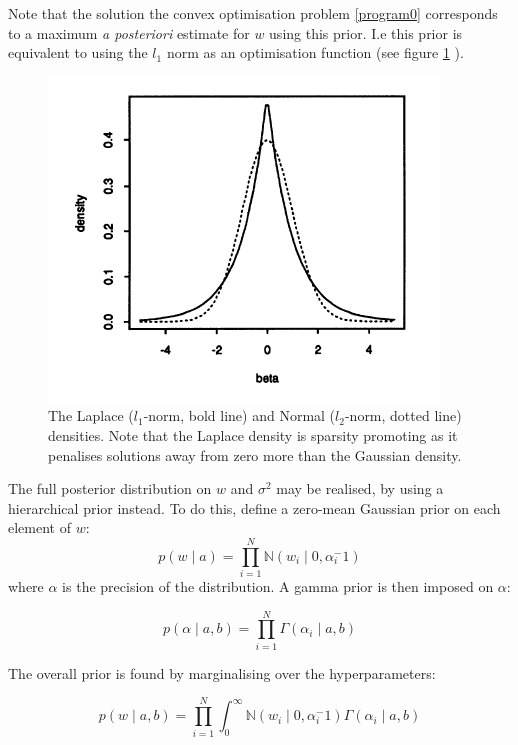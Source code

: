 \documentclass[12pt]{report}
\begin{document}
Note that the solution the convex optimisation problem \ref{program0} corresponds to a maximum \textit{a posteriori} estimate for \(w\) using this prior. I.e this prior is equivalent to using the \(l_1\) norm as an optimisation function (see figure \ref{laplacenormal} \cite{Tibshirani1996}).

\begin{figure}[h]
\centering
\includegraphics[height = 7 cm]{LaplaceandNormalDensity.png}
\caption{The Laplace (\(l_1\)-norm, bold line) and Normal (\(l_2\)-norm, dotted line) densities. Note that the Laplace density is sparsity promoting as it penalises solutions away from zero more than the Gaussian density. \cite{Tibshirani1996}}
\label{laplacenormal}
\end{figure}

The full posterior distribution on \(w\) and \(\sigma^2\) may be realised, by using a hierarchical prior instead. To do this, define a zero-mean Gaussian prior on each element of \(w\):
%
\begin{equation}
p\left(w\mid a\right) = \prod_{i=1}^{N}\mathbb{N}\left(w_i\mid 0, \alpha_{i}^-1\right)
\end{equation}
%
where \(\alpha\) is the precision of the distribution. A gamma prior is then imposed on \(\alpha\):

\begin{equation}
p\left(\alpha \mid a, b \right) = \prod_{i=1}^{N} \Gamma\left( \alpha_i \mid a, b \right)
\end{equation}

The overall prior is found by marginalising over the hyperparameters:

\begin{equation}
p\left( w \mid a, b \right) = \prod_{i=1}^{N} \int_{0}^{\infty} \mathbb{N}\left(w_i\mid 0, \alpha_{i}^-1\right) \Gamma\left( \alpha_i \mid a, b \right)
\end{equation}
\end{document}
